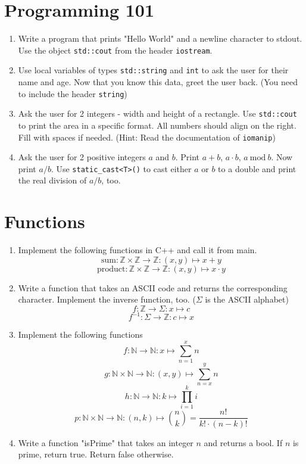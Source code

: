 \documentclass[12pt, a4paper]{article}
\begin{document}
\section*{Programming 101}
\begin{enumerate}
    \item Write a program that prints "Hello World" and a newline character to stdout. Use the object \lstinline{std::cout} from the header \lstinline{iostream}.
    \item Use local variables of types \lstinline{std::string} and \lstinline{int} to ask the user for their name and age. Now that you know this data, greet the user back. (You need to include the header \lstinline{string})
    \item Ask the user for 2 integers - width and height of a rectangle. Use \lstinline{std::cout} to print the area in a specific format. All numbers should align on the right. Fill with spaces if needed. (Hint: Read the documentation of \lstinline{iomanip})
    \item Ask the user for 2 positive integers $a$ and $b$. Print $a + b$, $a \cdot b$, $a \ \textrm{mod} \ b$. Now print $a / b$. Use \lstinline{static_cast<T>()} to cast either $a$ or $b$ to a double and print the real division of $a / b$, too.
\end{enumerate}
\section*{Functions}
\begin{enumerate}
    \item Implement the following functions in C++ and call it from main.
    $$ \textrm{sum}: \mathbb{Z} \times \mathbb{Z} \to \mathbb{Z}: (x,y) \mapsto x + y $$
    $$ \textrm{product}: \mathbb{Z} \times \mathbb{Z} \to \mathbb{Z}: (x,y) \mapsto x \cdot y $$
    \item Write a function that takes an ASCII code and returns the corresponding character. Implement the inverse function, too. ($\Sigma$ is the ASCII alphabet)
    $$ f: \mathbb{Z} \to \Sigma: x \mapsto c $$
    $$ f^{-1}: \Sigma \to \mathbb{Z}: c \mapsto x $$
    \item Implement the following functions
    $$f: \mathbb{N} \to \mathbb{N}: x \mapsto \sum_{n=1}^{x} n$$
    $$g: \mathbb{N} \times \mathbb{N} \to \mathbb{N}: (x,y) \mapsto \sum_{n=x}^{y} n $$
    $$h: \mathbb{N} \to \mathbb{N}: k \mapsto \prod_{i=1}^{k} i$$
    $$p: \mathbb{N} \times \mathbb{N} \to \mathbb{N}: (n, k) \mapsto \binom{n}{k} = \frac{n!}{k! \cdot (n-k)!}$$
    \item Write a function "isPrime" that takes an integer $n$ and returns a bool. If $n$ is prime, return true. Return false otherwise.

\end{enumerate}
\end{document}
